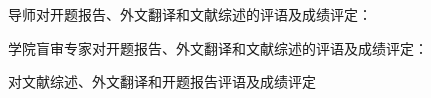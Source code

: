 
{
    \bfseries

    {
        \noindent 导师对开题报告、外文翻译和文献综述的评语及成绩评定：
    }


    \vspace{50mm}
    \thesisproposaleval[10][15][5]
    \signature{导师签名}

    {
        \noindent 学院盲审专家对开题报告、外文翻译和文献综述的评语及成绩评定：
    }


    \mbox{} \vfill
    \thesisproposaleval
    \signature{开题报告审核负责人（签名/签章）}
}
{
    \bfseries

    {
        \noindent 对文献综述、外文翻译和开题报告评语及成绩评定
    }


    \mbox{} \vfill
    \thesisproposaleval
    \signature{开题报告答辩小组负责人（签名）}
}
